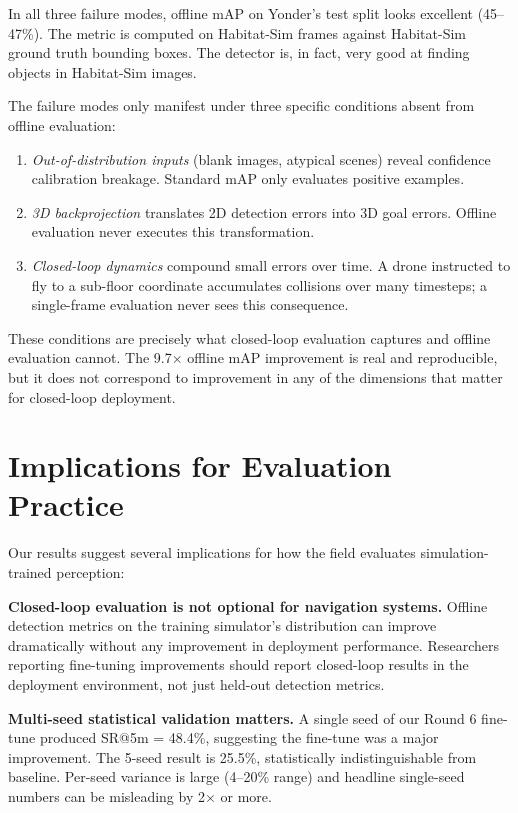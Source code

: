 \documentclass{article}
\begin{document}
In all three failure modes, offline mAP on Yonder's test split looks excellent (45--47\%). The metric is computed on Habitat-Sim frames against Habitat-Sim ground truth bounding boxes. The detector is, in fact, very good at finding objects in Habitat-Sim images.

The failure modes only manifest under three specific conditions absent from offline evaluation:

\begin{enumerate}
\item \textit{Out-of-distribution inputs} (blank images, atypical scenes) reveal confidence calibration breakage. Standard mAP only evaluates positive examples.
\item \textit{3D backprojection} translates 2D detection errors into 3D goal errors. Offline evaluation never executes this transformation.
\item \textit{Closed-loop dynamics} compound small errors over time. A drone instructed to fly to a sub-floor coordinate accumulates collisions over many timesteps; a single-frame evaluation never sees this consequence.
\end{enumerate}

These conditions are precisely what closed-loop evaluation captures and offline evaluation cannot. The 9.7$\times$ offline mAP improvement is real and reproducible, but it does not correspond to improvement in any of the dimensions that matter for closed-loop deployment.

\section{Implications for Evaluation Practice}

Our results suggest several implications for how the field evaluates simulation-trained perception:

\textbf{Closed-loop evaluation is not optional for navigation systems.} Offline detection metrics on the training simulator's distribution can improve dramatically without any improvement in deployment performance. Researchers reporting fine-tuning improvements should report closed-loop results in the deployment environment, not just held-out detection metrics.

\textbf{Multi-seed statistical validation matters.} A single seed of our Round 6 fine-tune produced SR@5m = 48.4\%, suggesting the fine-tune was a major improvement. The 5-seed result is 25.5\%, statistically indistinguishable from baseline. Per-seed variance is large (4--20\% range) and headline single-seed numbers can be misleading by 2$\times$ or more.
\end{document}

